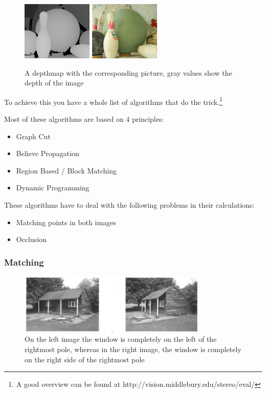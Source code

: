 \documentclass[a4paper]{article}
\begin{document}
\begin{figure} \centering
\includegraphics[width=0.3\textwidth]{depthmap}
\includegraphics[width=0.3\textwidth]{depthmap_original}
\caption{A depthmap with the corresponding picture, gray values show
  the depth of the image}
\label{dm_exapmle}
\end{figure}

To achieve this you have a whole list of algorithms that do the
trick.\footnote{A good overview can be found at
http://vision.middlebury.edu/stereo/eval/}

Most of these algorithms are based on 4 principles:

\begin{itemize}
\item Graph Cut
\item Believe Propagation
\item Region Based / Block Matching
\item Dynamic Programming
\end{itemize}

These algorithms have to deal with the following problems in their
calculations:

\begin{itemize}
    \item Matching points in both images
    \item Occlusion
\end{itemize}


\subsubsection{Matching} 


\begin{figure} [h!tb]
\centering
\includegraphics[width=0.8\textwidth]{matching_problems_direction}
\caption{On the left image the window is completely on the left of the
  rightmost pole, whereas in the right image, the window is completely
  on the right side of the rightmost pole}
\label{dirprob}
\end{figure}
\end{document}
